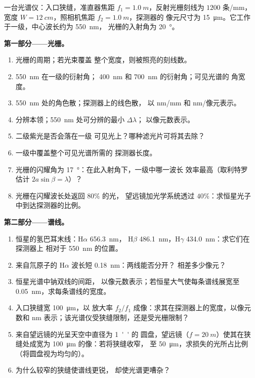 \begin{problem}
\label{pb:b2:gratings:1}

一台光谱仪：入口狭缝，准直器焦距 $f_1 =
\qty{1.0}{m}$，反射光栅刻线为 $1200$ 条/mm，宽度 $W =
\qty{12}{cm}$，照相机焦距 $f_2 = \qty{1.0}{m}$，探测器的
像元尺寸为 \qty{15}{\micro m}。它工作于一级，中心波长约为 \qty{550}{nm}，
光栅的入射角为 \qty{20}{\degree}。

\medskip
\noindent\textbf{第一部分——光栅。}
\begin{enumerate}
  \item 光栅的周期；若光束覆盖
        整个宽度，则被照亮的刻线数。
  \item \qty{550}{nm} 在一级的衍射角；
        \qty{400}{nm} 和 \qty{700}{nm} 的衍射角；可见光谱的
        角宽度。
  \item \qty{550}{nm} 处的角色散；探测器上的线色散，
        以 nm/mm 和 nm/像元表示。
  \item 分辨本领；\qty{550}{nm} 处可分辨的最小 $\Delta\lambda$；
        以像元数表示。
  \item 二级紫光是否会落在一级
        可见光上？哪种滤光片可将其去除？
  \item 一级中覆盖整个可见光谱所需的
        探测器长度。
  \item 光栅的闪耀角为 \qty{17}{\degree}：在此入射角下，一级中哪一波长
        效率最高（取利特罗估计
        $2a\sin\beta = \lambda$）？
  \item 光栅在闪耀波长处返回 $80\%$ 的光，
        望远镜加光学系统透过 $40\%$：求恒星光子
        中到达探测器的比例。
\end{enumerate}

\medskip
\noindent\textbf{第二部分——谱线。}
\begin{enumerate}[resume]
  \item 恒星的氢巴耳末线：H$\alpha$ \qty{656.3}{nm}，
        H$\beta$ \qty{486.1}{nm}，H$\gamma$ \qty{434.0}{nm}：求它们在探测器上
        相对于 \qty{550}{nm} 的位置。
  \item 来自氘原子的 H$\alpha$ 波长短 \qty{0.18}{nm}：两线能否分开？
        相差多少像元？
  \item 恒星光谱中钠双线的间距，
        以像元数表示；若恒星大气使每条谱线展宽至
        \qty{0.05}{nm}，求每条谱线的宽度。
  \item 入口狭缝宽 \qty{100}{\micro m}，以
        放大率 $f_2/f_1$ 成像：求其在探测器上的宽度，以像元数和
        nm 表示；该光谱仪受狭缝限制，还是受光栅限制？
  \item 来自望远镜的光呈天空中直径为 \qty{1}{''} 的
        圆盘，望远镜（$f = \qty{20}{m}$）使其在狭缝处成宽为 \qty{100}{\micro m}
        的像：若将狭缝收窄，
        至 \qty{50}{\micro m}，求损失的光所占比例（将圆盘视为均匀的）。
  \item 为什么较窄的狭缝使谱线更锐，
        却使光谱更嘈杂？
\end{enumerate}


\end{problem}
